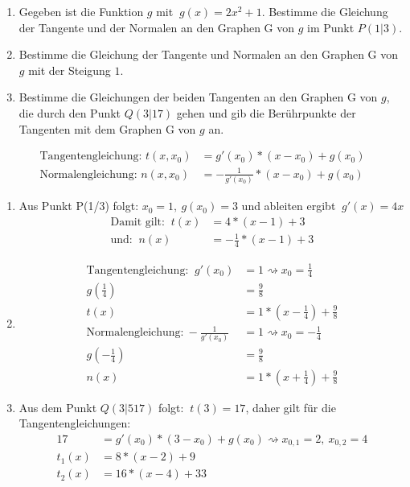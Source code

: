 \begin{enumerate}
	\item Gegeben ist die Funktion $g$ mit $\ g(x)=2x^2+1$. Bestimme die Gleichung der Tangente und der Normalen an den Graphen G von $g$ im Punkt $P(1|3)$.
  \item Bestimme die Gleichung der Tangente und Normalen an den Graphen G von $g$ mit der Steigung $1$.
  \item Bestimme die Gleichungen der beiden Tangenten an den Graphen G von $g$, die durch den Punkt $Q(3|17)$ gehen und gib die Berührpunkte der Tangenten mit dem Graphen G von $g$ an.
\end{enumerate}
\begin{lsg}{}
	\begin{align*}
		\text{Tangentengleichung: }  t(x,x_0)&=g'(x_0)*(x-x_0)+g(x_0)\\
	\text{Normalengleichung: }n(x,x_0)&=-\frac{1}{g'(x_0)}*(x-x_0)+g(x_0)
	\end{align*}

	\begin{enumerate}
		\item Aus Punkt P(1/3) folgt: $x_0=1,\ g(x_0)=3$ und ableiten ergibt $\ g'(x)=4x$
		\begin{align*}
		\text{Damit gilt: }\ t(x)&=4*(x-1)+3 \\
		\text{und: }\ n(x)&=-\frac{1}{4}*(x-1)+3
		\end{align*}
		\item \begin{align*}
			\text{Tangentengleichung: }\ g'(x_0)&=1 \rightsquigarrow x_0=\frac{1}{4}\\
			g\left(\frac{1}{4}\right)&=\frac{9}{8}\\
			t(x)&=1*\left(x-\frac{1}{4}\right)+\frac{9}{8}\\
			\text{Normalengleichung:}\ -\frac{1}{g'(x_0)}&=1 \rightsquigarrow x_0=-\frac{1}{4}\\
			g\left(-\frac{1}{4}\right)&=\frac{9}{8}\\
			n(x)&=1*\left(x+\frac{1}{4}\right)+\frac{9}{8}
			\end{align*}
			\item Aus dem Punkt $Q(3|517)$ folgt: $\ t(3)=17$, daher gilt für die Tangentengleichungen:\begin{align*}
			17&=g'(x_0)*(3-x_0)+g(x_0) \rightsquigarrow x_{0,1}=2,\ x_{0,2}=4\\
			t_1(x)&=8*(x-2)+9\\
			t_2(x)&=16*(x-4)+33
			\end{align*}
	\end{enumerate}
\end{lsg}



